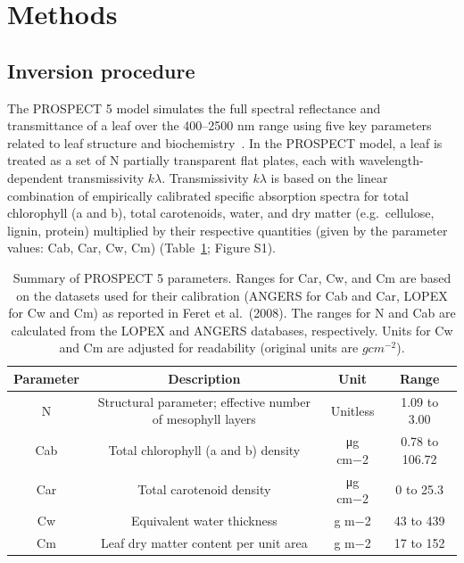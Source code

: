 \section{Methods}\label{sec:pecanrtm-methods}

\subsection{Inversion procedure}

The PROSPECT 5 model simulates the full spectral reflectance and transmittance of a leaf over the 400--2500 nm range using five key parameters related to leaf structure and biochemistry~\cite{feret_2008_prospect}.
In the PROSPECT model, a leaf is treated as a set of N partially transparent flat plates, each with wavelength-dependent transmissivity $k\lambda$.
Transmissivity $k\lambda$ is based on the linear combination of empirically calibrated specific absorption spectra for total chlorophyll (a and b), total carotenoids, water, and dry matter (e.g.\ cellulose, lignin, protein) multiplied by their respective quantities (given by the parameter values: Cab, Car, Cw, Cm) (Table~\ref{tab:pecanrtm-parameters}; Figure S1). %

\begin{table}
  \caption{%
    Summary of PROSPECT 5 parameters.
    Ranges for Car, Cw, and Cm are based on the datasets used for their calibration (ANGERS for Cab and Car, LOPEX for Cw and Cm) as reported in Feret et al.~(2008).
    The ranges for N and Cab are calculated from the LOPEX and ANGERS databases, respectively.
    Units for Cw and Cm are adjusted for readability (original units are $g cm^{−2}$).
  }\label{tab:pecanrtm-parameters}
  \begin{tabular}{cccc}
    \toprule
    Parameter & Description & Unit & Range \\
    \midrule
    N & Structural parameter; effective number of mesophyll layers & Unitless & 1.09 to 3.00 \\
    Cab & Total chlorophyll (a and b) density & μg cm−2 & 0.78 to 106.72 \\
    Car & Total carotenoid density & μg cm−2 & 0 to 25.3 \\
    Cw & Equivalent water thickness & g m−2 & 43 to 439 \\
    Cm & Leaf dry matter content per unit area & g m−2 & 17 to 152 \\
    \bottomrule
  \end{tabular}
\end{table}

